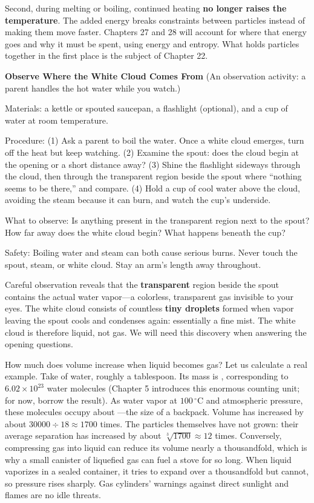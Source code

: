 Second, during melting or boiling, continued heating \textbf{no longer raises the temperature}. The added energy breaks constraints between particles instead of making them move faster. Chapters 27 and 28 will account for where that energy goes and why it must be spent, using energy and entropy. What holds particles together in the first place is the subject of Chapter 22.

\begin{shiyan}
\textbf{Observe Where the White Cloud Comes From} (An observation activity: a parent handles the hot water while you watch.)

Materials: a kettle or spouted saucepan, a flashlight (optional), and a cup of water at room temperature.

Procedure: (1) Ask a parent to boil the water. Once a white cloud emerges, turn off the heat but keep watching. (2) Examine the spout: does the cloud begin at the opening or a short distance away? (3) Shine the flashlight sideways through the cloud, then through the transparent region beside the spout where ``nothing seems to be there,'' and compare. (4) Hold a cup of cool water above the cloud, avoiding the steam because it can burn, and watch the cup's underside.

What to observe: Is anything present in the transparent region next to the spout? How far away does the white cloud begin? What happens beneath the cup?

Safety: Boiling water and steam can both cause serious burns. Never touch the spout, steam, or white cloud. Stay an arm's length away throughout.
\end{shiyan}

Careful observation reveals that the \textbf{transparent} region beside the spout contains the actual water vapor---a colorless, transparent gas invisible to your eyes. The white cloud consists of countless \textbf{tiny droplets} formed when vapor leaving the spout cools and condenses again: essentially a fine mist. The white cloud is therefore liquid, not gas. We will need this discovery when answering the opening questions.

\begin{qiaoliang}
How much does volume increase when liquid becomes gas? Let us calculate a real example. Take  of water, roughly a tablespoon. Its mass is , corresponding to $6.02\times 10^{23}$ water molecules (Chapter 5 introduces this enormous counting unit; for now, borrow the result). As water vapor at $100\,^{\circ}\mathrm{C}$ and atmospheric pressure, these molecules occupy about ---the size of a backpack. Volume has increased by about $30000\div 18\approx 1700$ times. The particles themselves have not grown: their average separation has increased by about $\sqrt[3]{1700}\approx 12$ times. Conversely, compressing gas into liquid can reduce its volume nearly a thousandfold, which is why a small canister of liquefied gas can fuel a stove for so long. When liquid vaporizes in a sealed container, it tries to expand over a thousandfold but cannot, so pressure rises sharply. Gas cylinders' warnings against direct sunlight and flames are no idle threats.
\end{qiaoliang}


